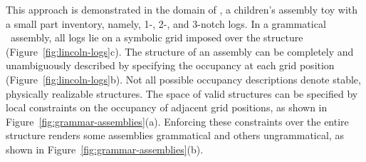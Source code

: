 This approach is demonstrated in the domain of \LincolnLogs, a children's
assembly toy with a small part inventory, namely, 1-, 2-, and 3-notch
logs.
%
In a grammatical \LincolnLog\ assembly, all logs lie on a symbolic grid imposed
over the structure (Figure~\ref{fig:lincoln-logs}c).
%
The structure of an assembly can be completely and unambiguously described by
specifying the occupancy at each grid position
(Figure~\ref{fig:lincoln-logs}b).
%
Not all possible occupancy descriptions denote stable, physically realizable
structures.
%
The space of valid structures can be specified by local constraints on the
occupancy of adjacent grid positions, as shown in
Figure~\ref{fig:grammar-assemblies}(a).
%
Enforcing these constraints over the entire structure renders some assemblies
grammatical and others ungrammatical, as shown in
Figure~\ref{fig:grammar-assemblies}(b).

